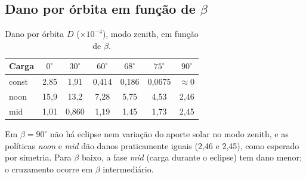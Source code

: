 \documentclass[12pt,a4paper]{article}
\begin{document}
\subsection{Dano por órbita em função de $\beta$}
\begin{table}[h]\centering\small
\caption{Dano por órbita $D$ ($\times10^{-4}$), modo zenith, em função de
$\beta$.}
\label{tab:dbeta}
\begin{tabular}{@{}lcccccc@{}}\toprule
Carga & $0^\circ$ & $30^\circ$ & $60^\circ$ & $68^\circ$ & $75^\circ$ & $90^\circ$\\\midrule
const & 2,85 & 1,91 & 0,414 & 0,186 & 0,0675 & $\approx0$\\
noon & 15,9 & 13,2 & 7,28 & 5,75 & 4,53 & 2,46\\
mid & 1,01 & 0,860 & 1,19 & 1,45 & 1,73 & 2,45\\
\bottomrule\end{tabular}\end{table}
Em $\beta=90^\circ$ não há eclipse nem variação do aporte solar no modo zenith,
e as políticas \emph{noon} e \emph{mid} dão danos praticamente iguais
(2,46 e 2,45), como esperado por simetria. Para $\beta$ baixo, a fase
\emph{mid} (carga durante o eclipse) tem dano menor; o cruzamento ocorre em
$\beta$ intermediário.
\end{document}
